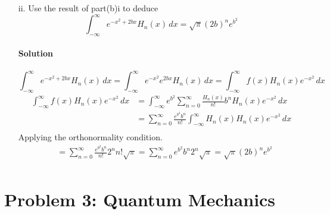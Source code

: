 \documentclass{article}
\begin{document}
{\begin{enumerate}
\begin{enumerate}
			\paragraph{Solution} Using the generating function.
			\[
				e^{2tx - t^2} = \sum_{n=0}^{\infty} \frac{H_n(x)}{n!} t^n 
			\]
			$t$ can be any real number. Set $t=b$.
			\[
				e^{2bx} e^{-b^2} = \sum_{n=0}^{\infty} \frac{H_n(x)}{n!} b^n
			\]
			\[
				f(x) = e^{2bx}  = e^{b^2} \sum_{n=0}^{\infty} \frac{H_n(x)}{n!} b^n
			\]
			\item[ii.] Use the result of part(b)i to deduce
			\[
				\int_{-\infty}^{\infty} e^{-x^2 + 2bx} H_n(x) \, dx = \sqrt{\pi} (2b)^n e^{b^2}
			\]
			\paragraph{Solution}
			\[
				\int_{-\infty}^{\infty} e^{-x^2 + 2bx} H_n(x) \, dx = \int_{-\infty}^{\infty} e^{-x^2} e^{2bx} H_n(x) \, dx = \int_{-\infty}^{\infty} f(x) H_n(x) e^{-x^2} \, dx
			\]
			\begin{equation*}
				\begin{split}
					\int_{-\infty}^{\infty} f(x) H_n(x) e^{-x^2} \, dx &= \int_{-\infty}^{\infty} e^{b^2} \sum_{n=0}^{\infty} \frac{H_n(x)}{n!} b^n H_n(x) e^{-x^2} \, dx \\
					&= \sum_{n=0}^{\infty} \frac{e^{b^2} b^n}{n!} \int_{-\infty}^{\infty} H_n(x) H_n(x) e^{-x^2} \, dx \\
				\end{split}
			\end{equation*}
			Applying the orthonormality condition.
			\begin{equation*}
				\begin{split}
					&= \sum_{n=0}^{\infty} \frac{e^{b^2} b^n}{n!} 2^n n! \sqrt{\pi} = \sum_{n=0}^{\infty} e^{b^2} b^n 2^n \sqrt{\pi} = \sqrt{\pi} (2b)^n e^{b^2} \\
				\end{split}
			\end{equation*}
		\end{enumerate}
	\end{enumerate}

	\section*{Problem 3: Quantum Mechanics}
}
\end{document}
